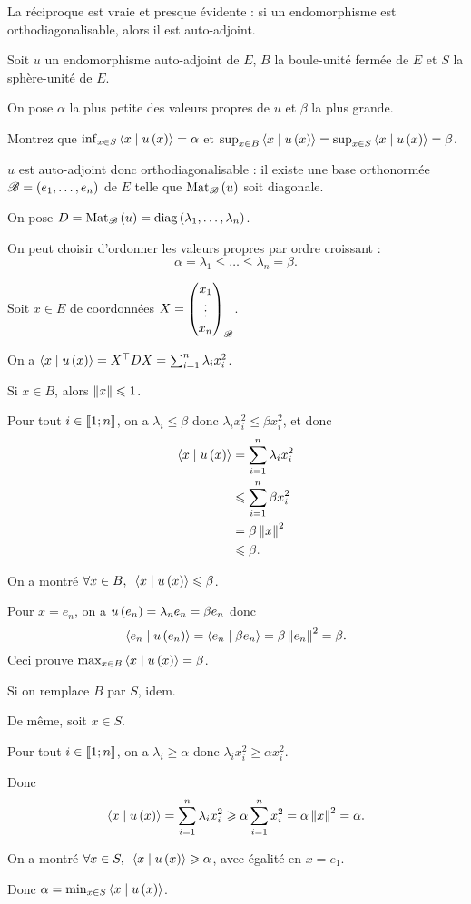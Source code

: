 \begin{rem}
La réciproque est vraie et presque évidente : si un endomorphisme est orthodiagonalisable, alors il est auto-adjoint.
\end{rem}

\begin{exo}
Soit \(u\) un endomorphisme auto-adjoint de \(E\), \(B\) la boule-unité fermée de \(E\) et \(S\) la sphère-unité de \(E\).

On pose \(\alpha\) la plus petite des valeurs propres de \(u\) et \(\beta\) la plus grande.

Montrez que \(\inf_{x\in S}\ps{x}{u\paren{x}}=\alpha\) et \(\sup_{x\in B}\ps{x}{u\paren{x}}=\sup_{x\in S}\ps{x}{u\paren{x}}=\beta\).
\end{exo}

\begin{corr}
\(u\) est auto-adjoint donc orthodiagonalisable : il existe une base orthonormée \(\mathscr{B}=\left(e_1,\dots,e_n\right)\) de \(E\) telle que \(\Mat{u}\) soit diagonale.

On pose \(D=\Mat{u}=\diag{\lambda_1,\dots,\lambda_n}\).

On peut choisir d'ordonner les valeurs propres par ordre croissant : \[\alpha=\lambda_1\leq\dots\leq\lambda_n=\beta.\]

Soit \(x\in E\) de coordonnées \(X=\begin{pmatrix}x_1\\\vdots\\x_n\end{pmatrix}_{\mathscr{B}}\).

On a \(\ps{x}{u\paren{x}}=\trans{X}DX=\sum_{i=1}^n\lambda_ix_i^2\).

Si \(x\in B\), alors \(\norme{x}\leq1\).

Pour tout \(i\in\left\llbracket1;n\right\rrbracket\), on a \(\lambda_i\leq\beta\) donc \(\lambda_ix_i^2\leq\beta x_i^2\), et donc \[\begin{aligned}
\ps{x}{u\paren{x}}&=\sum_{i=1}^n\lambda_ix_i^2 \\
&\leq\sum_{i=1}^n\beta x_i^2 \\
&=\beta\norme{x}^2 \\
&\leq\beta.
\end{aligned}\]

On a montré \(\quantifs{\forall x\in B}\ps{x}{u\paren{x}}\leq\beta\).

Pour \(x=e_n\), on a \(u\left(e_n\right)=\lambda_ne_n=\beta e_n\) donc \[\ps{e_n}{u\paren{e_n}}=\ps{e_n}{\beta e_n}=\beta\norme{e_n}^2=\beta.\] Ceci prouve \(\max_{x\in B}\ps{x}{u\paren{x}}=\beta\).

Si on remplace \(B\) par \(S\), idem.

De même, soit \(x\in S\).

Pour tout \(i\in\left\llbracket1;n\right\rrbracket\), on a \(\lambda_i\geq\alpha\) donc \(\lambda_ix_i^2\geq\alpha x_i^2\).

Donc \[\ps{x}{u\paren{x}}=\sum_{i=1}^n\lambda_ix_i^2\geq\alpha\sum_{i=1}^nx_i^2=\alpha\norme{x}^2=\alpha.\]

On a montré \(\quantifs{\forall x\in S}\ps{x}{u\paren{x}}\geq\alpha\), avec égalité en \(x=e_1\).

Donc \(\alpha=\min_{x\in S}\ps{x}{u\paren{x}}\).
\end{corr}

